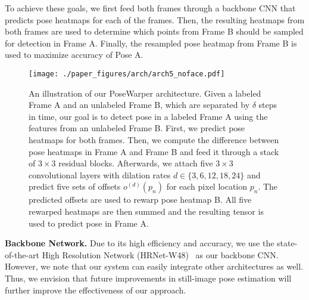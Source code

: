 \documentclass{article}
\begin{document}
To achieve these goals, we first feed both frames through a backbone CNN that predicts pose heatmaps for each of the frames. Then, the resulting heatmaps from both frames are used to determine which points from Frame B should be sampled for detection in Frame A. Finally, the resampled pose heatmap from Frame B is used to maximize accuracy of Pose A. 

















\begin{figure}
\begin{center}
   \texttt{[image: ./paper\_figures/arch/arch5\_noface.pdf]}
\end{center}
\vspace{-0.2cm}
\caption{An illustration of our PoseWarper architecture. Given a labeled Frame A and an unlabeled Frame B, which are separated by $\delta$ steps in time, our goal is to detect pose in a labeled Frame A using the features from an unlabeled Frame B. First, we predict pose heatmaps for both frames. Then, we compute the difference between pose heatmaps in Frame A and Frame B and feed it through a stack of $3 \times 3$ residual blocks. Afterwards, we attach five $3 \times 3$ convolutional layers with dilation rates $d \in \{3, 6, 12, 18, 24\}$ and predict five sets of offsets $o^{(d)}(p_n)$ for each pixel location $p_n$. The predicted offsets are used to rewarp pose heatmap B. All five rewarped heatmaps are then summed and the resulting tensor is used to predict pose in Frame A.\vspace{-0.5cm}} \label{arch_fig}
\end{figure}




\textbf{Backbone  Network.}  Due to its high efficiency and accuracy, we use the state-of-the-art High Resolution Network (HRNet-W48)~\cite{sun2019deep} as our backbone CNN. However, we note that our system can easily integrate other architectures as well. Thus, we envision that future improvements in still-image pose estimation will further improve the effectiveness of our approach. 
\end{document}
